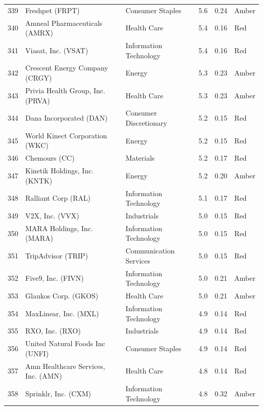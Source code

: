 \documentclass[11pt,a4paper]{article}
\begin{document}
{\begin{longtable}{r p{4.6cm} p{3cm} r r l}
339 & Freshpet (FRPT) & Consumer Staples & 5.6 & 0.24 & \cellcolor[HTML]{FFEB9C}Amber \\
340 & Amneal Pharmaceuticals (AMRX) & Health Care & 5.4 & 0.16 & \cellcolor[HTML]{F4B6B6}Red \\
341 & Viasat, Inc. (VSAT) & Information Technology & 5.4 & 0.16 & \cellcolor[HTML]{F4B6B6}Red \\
342 & Crescent Energy Company (CRGY) & Energy & 5.3 & 0.23 & \cellcolor[HTML]{FFEB9C}Amber \\
343 & Privia Health Group, Inc. (PRVA) & Health Care & 5.3 & 0.23 & \cellcolor[HTML]{FFEB9C}Amber \\
344 & Dana Incorporated (DAN) & Consumer Discretionary & 5.2 & 0.15 & \cellcolor[HTML]{F4B6B6}Red \\
345 & World Kinect Corporation (WKC) & Energy & 5.2 & 0.15 & \cellcolor[HTML]{F4B6B6}Red \\
346 & Chemours (CC) & Materials & 5.2 & 0.17 & \cellcolor[HTML]{F4B6B6}Red \\
347 & Kinetik Holdings, Inc. (KNTK) & Energy & 5.2 & 0.20 & \cellcolor[HTML]{FFEB9C}Amber \\
348 & Ralliant Corp (RAL) & Information Technology & 5.1 & 0.17 & \cellcolor[HTML]{F4B6B6}Red \\
349 & V2X, Inc. (VVX) & Industrials & 5.0 & 0.15 & \cellcolor[HTML]{F4B6B6}Red \\
350 & MARA Holdings, Inc. (MARA) & Information Technology & 5.0 & 0.15 & \cellcolor[HTML]{F4B6B6}Red \\
351 & TripAdvisor (TRIP) & Communication Services & 5.0 & 0.15 & \cellcolor[HTML]{F4B6B6}Red \\
352 & Five9, Inc. (FIVN) & Information Technology & 5.0 & 0.21 & \cellcolor[HTML]{FFEB9C}Amber \\
353 & Glaukos Corp. (GKOS) & Health Care & 5.0 & 0.21 & \cellcolor[HTML]{FFEB9C}Amber \\
354 & MaxLinear, Inc. (MXL) & Information Technology & 4.9 & 0.14 & \cellcolor[HTML]{F4B6B6}Red \\
355 & RXO, Inc. (RXO) & Industrials & 4.9 & 0.14 & \cellcolor[HTML]{F4B6B6}Red \\
356 & United Natural Foods Inc (UNFI) & Consumer Staples & 4.9 & 0.14 & \cellcolor[HTML]{F4B6B6}Red \\
357 & Amn Healthcare Services, Inc. (AMN) & Health Care & 4.8 & 0.14 & \cellcolor[HTML]{F4B6B6}Red \\
358 & Sprinklr, Inc. (CXM) & Information Technology & 4.8 & 0.32 & \cellcolor[HTML]{FFEB9C}Amber \\

\end{longtable}}
\end{document}
